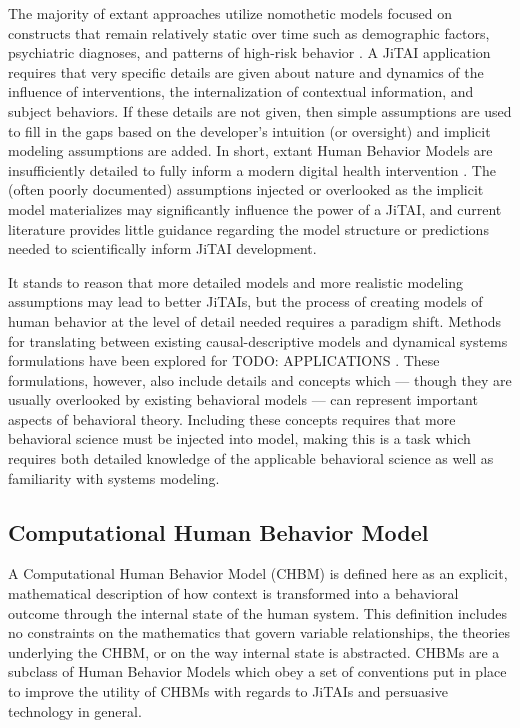 \documentclass[runningheads,a4paper]{llncs}
\begin{document}
The majority of extant approaches utilize nomothetic models focused on constructs that remain relatively static over time such as demographic factors, psychiatric diagnoses, and patterns of high-risk behavior \cite{Spruijt-Metz, Nilsen, & Pavel, 2014}.
A JiTAI application requires that very specific details are given about nature and dynamics of the influence of interventions, the internalization of contextual information, and subject behaviors.
If these details are not given, then simple assumptions are used to fill in the gaps based on the developer’s intuition (or oversight) and implicit modeling assumptions are added.
In short, extant Human Behavior Models are insufficiently detailed to fully inform a modern digital health intervention \cite{riley2011}.
The (often poorly documented) assumptions injected or overlooked as the implicit model materializes may significantly influence the power of a JiTAI, and current literature provides little guidance regarding the model structure or predictions needed to scientifically inform JiTAI development.

It stands to reason that more detailed models and more realistic modeling assumptions may lead to better JiTAIs, but the process of creating models of human behavior at the level of detail needed requires a paradigm shift.
Methods for translating between existing causal-descriptive models and dynamical systems formulations have been explored for TODO: APPLICATIONS \cite{csel?}. 
These formulations, however, also include details and concepts which --- though they are usually overlooked by existing behavioral models --- can represent important aspects of behavioral theory.
Including these concepts requires that more behavioral science must be injected into model, making this is a task which requires both detailed knowledge of the applicable behavioral science as well as familiarity with systems modeling.
\subsection{Computational Human Behavior Model}
A Computational Human Behavior Model (CHBM) is defined here as an explicit, mathematical description of how context is transformed into a behavioral outcome through the internal state of the human system.
This definition includes no constraints on the mathematics that govern variable relationships, the theories underlying the CHBM, or on the way internal state is abstracted.
CHBMs are a subclass of Human Behavior Models which obey a set of conventions put in place to improve the utility of CHBMs with regards to JiTAIs and persuasive technology in general.
\end{document}
